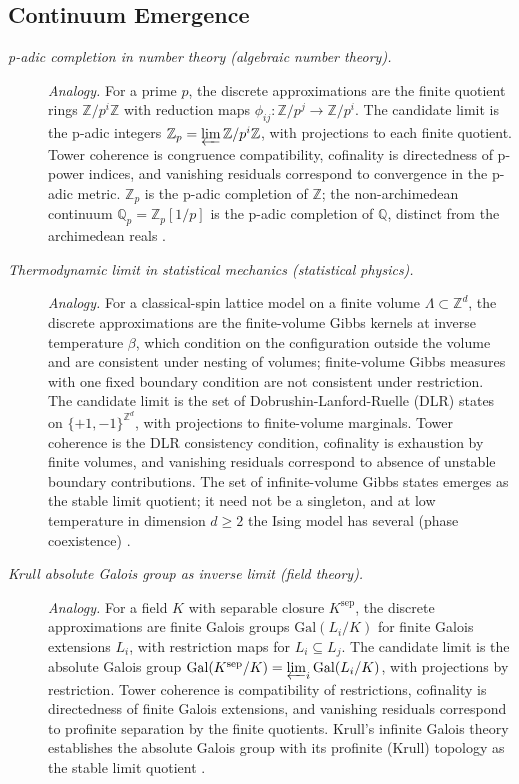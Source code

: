 \subsection*{ Continuum Emergence}
\begingroup\small
\begin{description}
\item[\emph{p-adic completion in number theory
(algebraic number theory).}] \textit{Analogy.}
For a prime \(p\), the discrete approximations are
the finite quotient rings \(\mathbb Z/p^i\mathbb Z\)
with reduction maps
\(\phi_{ij}:\mathbb Z/p^j\to\mathbb Z/p^i\).  The
candidate limit is the p-adic integers
\(\mathbb Z_p=\varprojlim\mathbb Z/p^i\mathbb Z\),
with projections to each finite quotient.  Tower
coherence is congruence compatibility, cofinality
is directedness of p-power indices, and vanishing
residuals correspond to convergence in the p-adic
metric.  \(\mathbb Z_p\) is the p-adic completion of
\(\mathbb Z\); the non-archimedean continuum
\(\mathbb Q_p=\mathbb Z_p[1/p]\) is the p-adic completion of
\(\mathbb Q\), distinct from the archimedean reals
\citep{Hensel1908Theorie}.

\item[\emph{Thermodynamic limit in statistical
mechanics (statistical physics).}] \textit{Analogy.}
For a classical-spin lattice model on a finite
volume \(\Lambda\subset\mathbb Z^d\), the discrete
approximations are the finite-volume Gibbs kernels at inverse
temperature \(\beta\), which condition on the configuration outside
the volume and are consistent under nesting of volumes; finite-volume
Gibbs measures with one fixed boundary condition are not consistent
under restriction.  The candidate limit is
the set of Dobrushin-Lanford-Ruelle (DLR) states
on \(\{+1,-1\}^{\mathbb Z^d}\), with projections
to finite-volume marginals.  Tower coherence is
the DLR consistency condition, cofinality is
exhaustion by finite volumes, and vanishing
residuals correspond to absence of unstable
boundary contributions.  The set of infinite-volume
Gibbs states emerges as the  stable limit quotient; it need
not be a singleton, and at low temperature in dimension \(d\ge 2\)
the Ising model has several (phase coexistence)
\citep{Ruelle1969StatisticalMechanics}.

\item[\emph{Krull absolute Galois group as inverse
limit (field theory).}] \textit{Analogy.}
For a field \(K\) with separable closure
\(K^{\mathrm{sep}}\), the discrete approximations
are finite Galois groups
\(\mathrm{Gal}(L_i/K)\) for finite Galois
extensions \(L_i\), with restriction maps for
\(L_i\subseteq L_j\).  The candidate limit is the
absolute Galois group
\(\mathrm{Gal}(K^{\mathrm{sep}}/K)
=\varprojlim_i\mathrm{Gal}(L_i/K)\), with
projections by restriction.  Tower coherence is
compatibility of restrictions, cofinality is
directedness of finite Galois extensions, and
vanishing residuals correspond to profinite
separation by the finite quotients.  Krull's
infinite Galois theory establishes the absolute
Galois group with its profinite (Krull) topology
as the  stable limit quotient
\citep{Krull1928Galois}.


\end{description}
